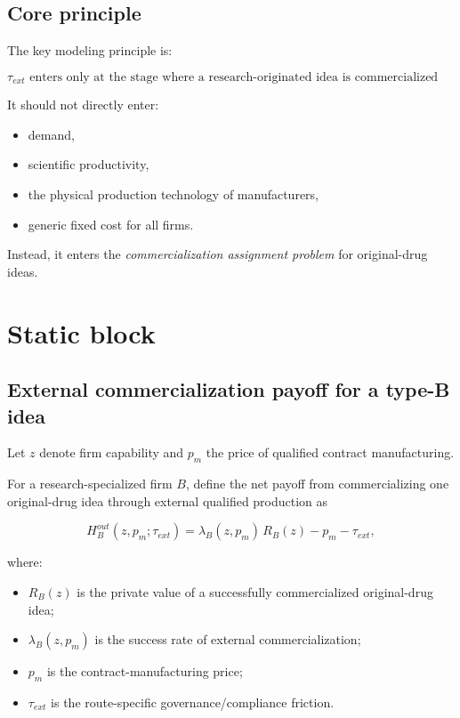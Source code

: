\documentclass[12pt]{article}
\begin{document}
\subsection{Core principle}

The key modeling principle is:

\[
\boxed{\tau_{ext}\text{ enters only at the stage where a research-originated idea is commercialized externally.}}
\]

It should not directly enter:
\begin{itemize}[leftmargin=2em]
    \item demand,
    \item scientific productivity,
    \item the physical production technology of manufacturers,
    \item generic fixed cost for all firms.
\end{itemize}

Instead, it enters the \emph{commercialization assignment problem} for original-drug ideas.

\section{Static block}

\subsection{External commercialization payoff for a type-B idea}

Let \(z\) denote firm capability and \(p_m\) the price of qualified contract manufacturing.

For a research-specialized firm \(B\), define the net payoff from commercializing one
original-drug idea through external qualified production as

\[
H_B^{out}(z,p_m;\tau_{ext})
=
\lambda_B(z,p_m)\,R_B(z)-p_m-\tau_{ext},
\]

where:
\begin{itemize}[leftmargin=2em]
    \item \(R_B(z)\) is the private value of a successfully commercialized original-drug idea;
    \item \(\lambda_B(z,p_m)\) is the success rate of external commercialization;
    \item \(p_m\) is the contract-manufacturing price;
    \item \(\tau_{ext}\) is the route-specific governance/compliance friction.
\end{itemize}
\end{document}
